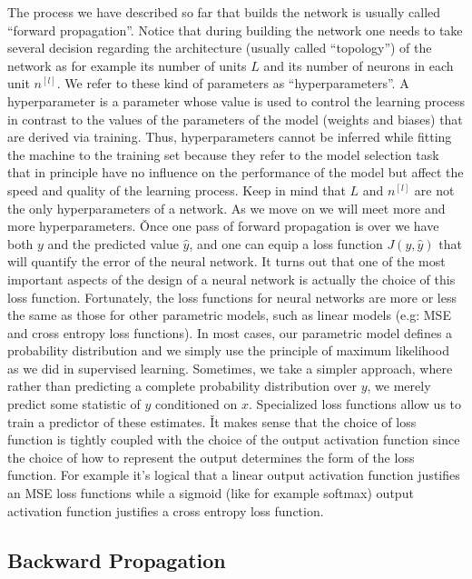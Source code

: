 The process we have described so far that builds the network is usually called ``forward propagation''. Notice that
during building the network one needs to take several decision regarding the architecture (usually called
``topology'') of the network as for example its number of units $L$ and its number of neurons in each unit $n^{[l]}$.
We refer to these kind of parameters as ``hyperparameters''. A hyperparameter is a parameter whose value is used to
control the learning process in contrast to the values of the parameters of the model (weights and biases) that are
derived via training. Thus, hyperparameters cannot be inferred while fitting the machine to the training set because
they refer to the model selection task that in principle have no influence on the performance of the model but affect
the speed and quality of the learning process. Keep in mind that $L$ and $n^{[l]}$ are not the only hyperparameters
of a network. As we move on we will meet more and more hyperparameters. \v

Once one pass of forward propagation is over we have both $y$ and the predicted value $\hat{y}$, and one can equip a
loss function $J(y, \hat{y})$ that will quantify the error of the neural network. It turns out that one of the most
important aspects of the design of a neural network is actually the choice of this loss function. Fortunately, the
loss functions for neural networks are more or less the same as those for other parametric models, such as linear
models (e.g: MSE and cross entropy loss functions). In most cases, our parametric model defines a probability
distribution and we simply use the principle of maximum likelihood as we did in supervised learning. Sometimes, we
take a simpler approach, where rather than predicting a complete probability distribution over $y$, we merely predict
some statistic of $y$ conditioned on $x$. Specialized loss functions allow us to train a predictor of these estimates.
\v

It makes sense that the choice of loss function is tightly coupled with the choice of the output activation function
since the choice of how to represent the output determines the form of the loss function. For example it's logical
that a linear output activation function justifies an MSE loss functions while a sigmoid (like for example softmax)
output activation function justifies a cross entropy loss function.

\subsection{Backward Propagation}

